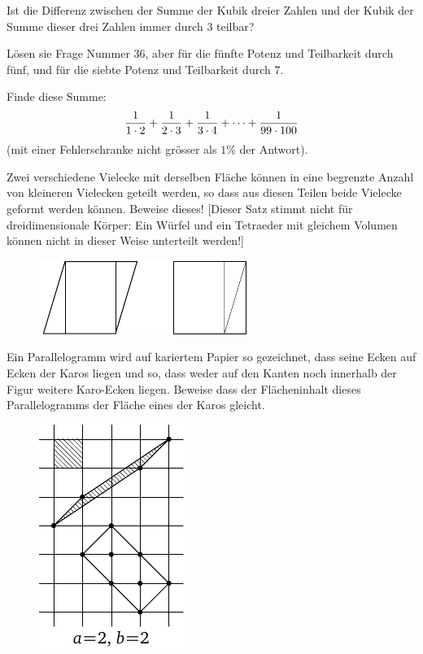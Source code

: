\documentclass[12pt]{article} %
\begin{document}
 Ist die Differenz zwischen der Summe der Kubik dreier Zahlen und der Kubik der Summe dieser drei Zahlen immer durch 3 teilbar? 

\bigskip
{} Lösen sie Frage Nummer 36, aber für die fünfte Potenz und Teilbarkeit durch fünf, und für die siebte Potenz und Teilbarkeit durch 7. 

\bigskip
{} Finde diese Summe:
$${1 \over 1\cdot 2} + {1 \over 2\cdot 3} + {1 \over 3\cdot 4} + \dots + {1 \over 99\cdot 100}$$
(mit einer Fehlerschranke nicht grösser als $1\%$ der Antwort).

\bigskip
{} Zwei verschiedene Vielecke mit derselben Fläche können in eine begrenzte Anzahl von kleineren Vielecken geteilt werden, so dass aus diesen Teilen beide Vielecke geformt werden können. Beweise dieses! [Dieser Satz stimmt nicht für dreidimensionale Körper: Ein Würfel und ein Tetraeder mit gleichem Volumen können nicht in dieser Weise unterteilt werden!]
\begin{figure}[h]
\centering
\includegraphics{q39_horizontal}\\[6pt]
\end{figure}

 Ein Parallelogramm wird auf kariertem Papier so gezeichnet, dass seine Ecken auf Ecken der Karos liegen und so, dass weder auf den Kanten noch innerhalb der Figur weitere Karo-Ecken liegen. Beweise dass der Flächeninhalt dieses Parallelogramms der Fläche eines der Karos gleicht. 
\begin{figure}[h]
\centering
\includegraphics{taskbook-24}\vskip3pt
\end{figure}
\end{document}
